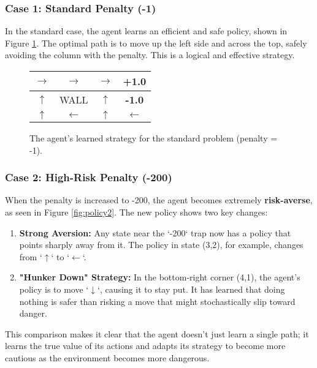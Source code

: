\documentclass[11pt, a4paper]{article}
\begin{document}
\subsubsection{Case 1: Standard Penalty (-1)}
In the standard case, the agent learns an efficient and safe policy, shown in Figure \ref{fig:policy1}. The optimal path is to move up the left side and across the top, safely avoiding the column with the penalty. This is a logical and effective strategy.

\begin{figure}[h!]
    \centering
    \begin{tabular}{|c|c|c|c|}
        \hline
        $\rightarrow$ & $\rightarrow$ & $\rightarrow$ & \textbf{+1.0} \\
        \hline
        $\uparrow$ & WALL & $\uparrow$ & \textbf{-1.0} \\
        \hline
        $\uparrow$ & $\leftarrow$ & $\uparrow$ & $\leftarrow$ \\
        \hline
    \end{tabular}
    \caption{The agent's learned strategy for the standard problem (penalty = -1).}
    \label{fig:policy1}
\end{figure}

\subsubsection{Case 2: High-Risk Penalty (-200)}
When the penalty is increased to -200, the agent becomes extremely \textbf{risk-averse}, as seen in Figure \ref{fig:policy2}. The new policy shows two key changes:
\begin{enumerate}
    \item \textbf{Strong Aversion:} Any state near the `-200` trap now has a policy that points sharply away from it. The policy in state (3,2), for example, changes from `$\uparrow$` to `$\leftarrow$`.
    
    \item \textbf{"Hunker Down" Strategy:} In the bottom-right corner (4,1), the agent's policy is to move `$\downarrow$`, causing it to stay put. It has learned that doing nothing is safer than risking a move that might stochastically slip toward danger.
\end{enumerate}

This comparison makes it clear that the agent doesn't just learn a single path; it learns the true value of its actions and adapts its strategy to become more cautious as the environment becomes more dangerous.
\end{document}
